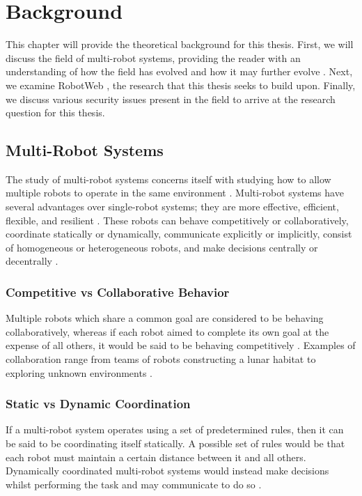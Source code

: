 \chapter{Background}


This chapter will provide the theoretical background for this thesis. First, we will discuss the field of multi-robot systems, providing the reader with an understanding of how the field has evolved and how it may further evolve . Next, we examine RobotWeb \cite{Robotweb}, the research that this thesis seeks to build upon. Finally, we discuss various security issues present in the field to arrive at the research question for this thesis.

\section{Multi-Robot Systems}
The study of multi-robot systems concerns itself with studying how to allow multiple robots to operate in the same environment \cite{MRS-Implicit-Explicit-Comms}. Multi-robot systems have several advantages over single-robot systems; they are more effective, efficient, flexible, and resilient \cite{MultiVsSingleRobotSystems}. These robots can behave competitively or collaboratively, coordinate statically or dynamically, communicate explicitly or implicitly, consist of homogeneous or heterogeneous robots, and make decisions centrally or decentrally \cite{MultiRobotCoordinationSurvey}. 

\subsection{Competitive vs Collaborative Behavior}
Multiple robots which share a common goal are considered to be behaving collaboratively, whereas if each robot aimed to complete its own goal at the expense of all others, it would be said to be behaving competitively \cite{MultiRobotCoordinationSurvey}. Examples of collaboration range from teams of robots constructing a lunar habitat \cite{LunarHabitatConstructionExample} to exploring unknown environments \cite{MultiRobotExplorationExample}.

\subsection{Static vs Dynamic Coordination}
If a multi-robot system operates using a set of predetermined rules, then it can be said to be coordinating itself statically. A possible set of rules would be that each robot must maintain a certain distance between it and all others. Dynamically coordinated multi-robot systems would instead make decisions whilst performing the task and may communicate to do so \cite{MultiRobotCoordinationSurvey}.

